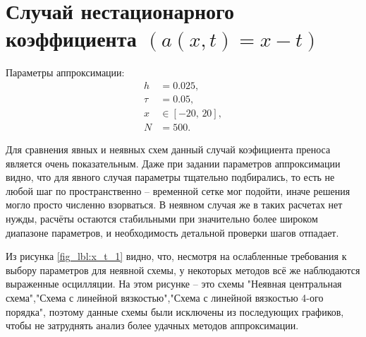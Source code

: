 \documentclass[a4paper,14pt]{extreport}
\begin{document}
\section*{{Случай нестационарного коэффициента $(a(x,t)=x-t)$}}

Параметры аппроксимации:
\[
\begin{aligned}
	h &= 0.025, \\
	\tau &= 0.05, \\
	x &\in [-20,\,20], \\
	N &= 500.
\end{aligned}
\]

Для сравнения явных и неявных схем данный случай коэфициента преноса является очень показательным. Даже при задании параметров аппроксимации видно, что для явного случая параметры тщательно подбирались, то есть не любой шаг по пространственно -- временной сетке мог подойти, иначе решения могло просто численно взорваться. В неявном случая же в таких расчетах нет нужды, расчёты остаются стабильными при значительно более широком диапазоне параметров, и необходимость детальной проверки шагов отпадает.

Из рисунка \ref{fig_lbl:x_t_1} видно, что, несмотря на ослабленные требования к выбору параметров для неявной схемы, у некоторых методов всё же наблюдаются выраженные осцилляции. На этом рисунке -- это схемы "Неявная центральная схема","Схема с линейной вязкостью","Схема с линейной вязкостью 4-ого порядка", поэтому данные схемы были исключены из последующих графиков, чтобы не затруднять анализ более удачных методов аппроксимации.
\end{document}
